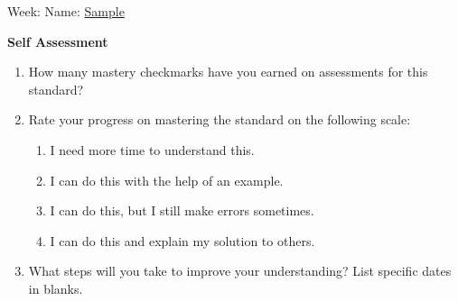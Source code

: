 \documentclass[letterpaper]{article}
\begin{document}
 Week: \underline{\phantom{xxxxxxxxxxxxxxxxx}} \hfill
  Name: \underline{Sample \phantom{xxxxxxxxxxxxxxxxxxxxxxxxxx}}\\

\begin{center}
{\Large \bf Self Assessment} \\
\end{center}
	



\begin{enumerate}
\item How many mastery checkmarks have you earned on assessments for this standard?

\item Rate your progress on mastering the standard on the following scale:
\begin{multicols}{2}
\begin{enumerate}[1.]
\item I need more time to understand this.
\item I can do this with the help of an example.
\item I can do this, but I still make errors sometimes.
\item I can do this and explain my solution to others.
\end{enumerate}
\end{multicols}

\item What steps will you take to improve your understanding? List specific dates in blanks.

\end{enumerate}
\end{document}

